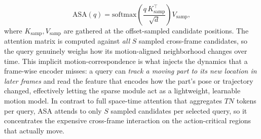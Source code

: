 \begin{equation}
  \mathrm{ASA}(q) = \mathrm{softmax}\!\left(\frac{q \, K_{\text{samp}}^\top}{\sqrt{d}}\right) V_{\text{samp}},
  \label{eq:sata-asa}
\end{equation}
where $K_{\text{samp}}, V_{\text{samp}}$ are gathered at the offset-sampled candidate positions.
The attention matrix is computed against \emph{all} $S$ sampled cross-frame candidates, so the query genuinely weighs how its motion-aligned neighborhood changes over time.
This implicit motion-correspondence is what injects the dynamics that a frame-wise encoder misses: a query can \emph{track a moving part to its new location in later frames} and read the feature that encodes how the part's pose or trajectory changed, effectively letting the sparse module act as a lightweight, learnable motion model. In contrast to full space-time attention that aggregates $T N$ tokens per query, ASA attends to only $S$ sampled candidates per selected query, so it concentrates the expensive cross-frame interaction on the action-critical regions that actually move.

